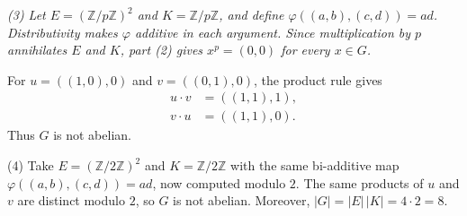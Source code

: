 \documentclass[12pt,a4paper]{article}
\begin{document}
{\color{blue}\itshape
(3) Let $E=(\mathbb Z/p\mathbb Z)^2$ and $K=\mathbb Z/p\mathbb Z$, and define
$\varphi((a,b),(c,d))=ad$. Distributivity makes $\varphi$ additive in each argument.
Since multiplication by $p$ annihilates $E$ and $K$, part (2) gives
$x^p=(0,0)$ for every $x\in G$.

For $u=((1,0),0)$ and $v=((0,1),0)$, the product rule gives
\begin{align*}
u\cdot v &= ((1,1),1), \\
v\cdot u &= ((1,1),0).
\end{align*}
Thus $G$ is not abelian.

(4) Take $E=(\mathbb Z/2\mathbb Z)^2$ and $K=\mathbb Z/2\mathbb Z$ with the same
bi-additive map $\varphi((a,b),(c,d))=ad$, now computed modulo $2$.
The same products of $u$ and $v$ are distinct modulo $2$, so $G$ is not
abelian. Moreover, $|G|=|E|\,|K|=4\cdot 2=8$.
\par
}
\end{document}
